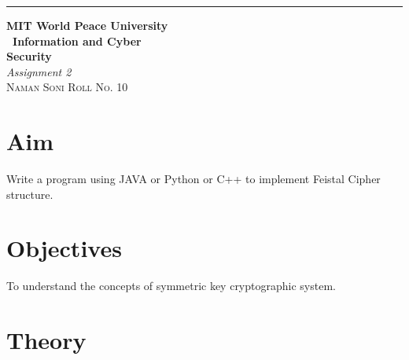 \documentclass{article}
\begin{document}
\begin{titlepage} %
		
		\raggedleft\rule{1pt}{\textheight} %
		\hspace{0.05\textwidth} %
		\parbox[b]{0.75\textwidth}
		{ %
			
			{\Huge\bfseries MIT World Peace University \\[0.5\baselineskip] \ Information and Cyber \\ Security}\\[2\baselineskip] %
			{\large\textit{Assignment 2}}\\[4\baselineskip] %
			{\Large\textsc{Naman Soni Roll No. 10}} %
			
			\vspace{0.5\textheight} %
		}
		
\end{titlepage}
\tableofcontents
\pagebreak
\section{\textbf{Aim}}
Write a program using JAVA or Python or C++ to implement Feistal Cipher structure.
\section{\textbf{Objectives}}
To understand the concepts of symmetric key cryptographic system.
\section{\textbf{Theory}}
\end{document}
